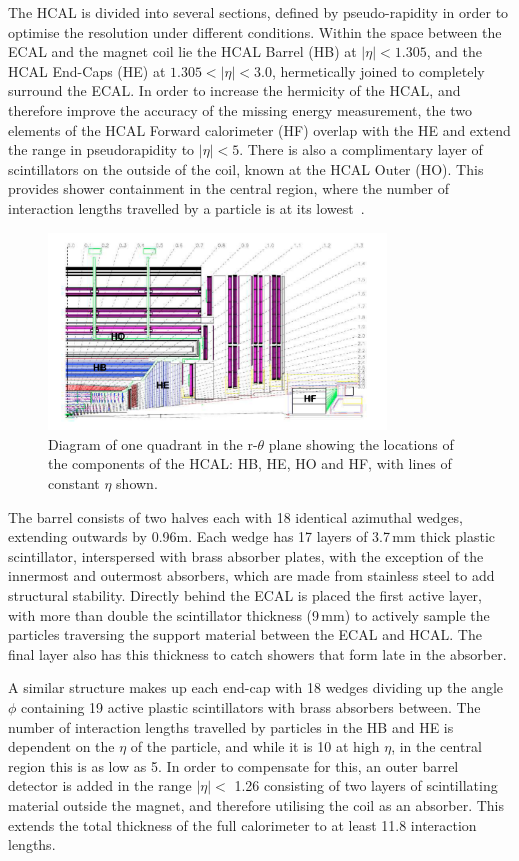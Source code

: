  The HCAL is divided into several sections, defined by pseudo-rapidity in order to optimise the resolution under different conditions. Within the space between the ECAL and the magnet coil lie the HCAL Barrel (HB) at $|\eta| < 1.305$, and the HCAL End-Caps (HE) at $1.305 < |\eta| < 3.0$, hermetically joined to completely surround the ECAL. In order to increase the hermicity of the HCAL, and therefore improve the accuracy of the missing energy measurement, the two elements of the HCAL Forward calorimeter (HF) overlap with the HE and extend the range in pseudorapidity to $|\eta|<5$. There is also a complimentary layer of scintillators on the outside of the coil, known at the HCAL Outer (HO).  This provides shower containment in the central region, where the number of interaction lengths travelled by a particle is at its lowest~\cite{HCALTDR}.


\begin{figure}
\centering
\includegraphics[width=0.8\textwidth]{Figures/Detector/HCAL}
\caption{Diagram of one quadrant in the r-$\theta$ plane showing the locations of the components of the HCAL: HB, HE, HO and HF, with lines of constant $\eta$ shown.}
\label{fig:HCAL}
\end{figure}


The barrel consists of two halves each with 18 identical azimuthal wedges, extending outwards by 0.96m. Each wedge has 17 layers of 3.7\,mm thick plastic scintillator, interspersed with brass absorber plates, with the exception of the innermost and outermost absorbers, which are made from stainless steel to add structural stability. Directly behind the ECAL is placed the first active layer, with more than double the scintillator thickness (9\,mm) to actively sample the particles traversing the support material between the ECAL and HCAL. The final layer also has this thickness to catch showers that form late in the absorber. 

A similar structure makes up each end-cap with 18 wedges dividing up the angle $\phi$ containing 19 active plastic scintillators with brass absorbers between. The number of interaction lengths travelled by particles in the HB and HE is dependent on the $\eta$ of the particle, and while it is 10 at high $\eta$, in the central region this is as low as 5. In order to compensate for this, an outer barrel detector is added in the range $|\eta| <$ 1.26 consisting of two layers of scintillating material outside the magnet, and therefore utilising the coil as an absorber. This extends the total thickness of the full calorimeter to at least 11.8 interaction lengths. 

